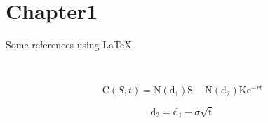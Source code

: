 \section{Chapter1}
	\label{sec:chapter1}

	Some references using \LaTeX

	\citep[p.~34]{de1998little} \\
	\citep{de1998little,bieger2013}



	\begin{equation}
	\mathrm C( S, t)= \mathrm N(\mathrm d_1)\mathrm S - \mathrm N(\mathrm d_2) \mathrm K \mathrm e^{-rt}
	\label{eq:1}
	\end{equation}

	\begin{equation}
	\mathrm d_2= \mathrm d_1 - \sigma \sqrt{\mathrm t}
	\label{eq:3}
	\end{equation}

	\newpage
